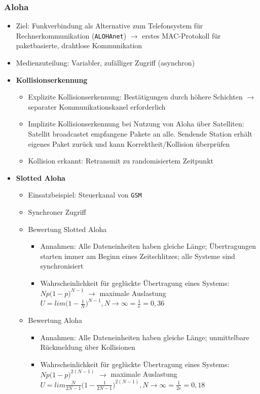 \subsubsection{Aloha}
\begin{itemize}
	\item Ziel: Funkverbindung als Alternative zum Telefonsystem für Rechnerkommunikation (\texttt{ALOHAnet}) \(\rightarrow\) erstes MAC-Protokoll für paketbasierte, drahtlose Kommunikation
	\item Medienzuteilung: Variabler, zufälliger Zugriff (asynchron)
	\item \textbf{Kollisionserkennung}
	\begin{itemize}
		\item Explizite Kollisionserkennung: Bestätigungen durch höhere Schichten \(\rightarrow\) separater Kommunikationskanel erforderlich
		\item Implizite Kollisionserkennung bei Nutzung von Aloha über Satelliten: Satellit broadcastet empfangene Pakete an alle. Sendende Station erhält eigenes Paket zurück und kann Korrektheit/Kollision überprüfen
		\item Kollision erkannt: Retransmit zu randomisiertem Zeitpunkt
	\end{itemize}
	\item \textbf{Slotted Aloha}
	\begin{itemize}
		\item Einsatzbeispiel: Steuerkanal von \texttt{GSM}
		\item Synchroner Zugriff
		\item Bewertung Slotted Aloha
		\begin{itemize}
			\item Annahmen: Alle Dateneinheiten haben gleiche Länge; Übertragungen starten immer am Beginn eines Zeitschlitzes; alle Systeme sind synchronisiert
			\item Wahrscheinlichkeit für geglückte Übertragung eines Systems: \(Np\big(1-p\big)^{N-1}\) \(\rightarrow\) maximale Auslastung \(U=lim \big(1-\frac{1}{N}\big)^{N-1}, N \rightarrow \infty = \frac{1}{e} = 0,36\)
		\end{itemize}
		\item Bewertung Aloha
		\begin{itemize}
			\item Annahmen: Alle Dateneinheiten haben gleiche Länge; unmittelbare Rückmeldung über Kollisionen
			\item Wahrscheinlichkeit für geglückte Übertragung eines Systems: \(Np\big(1-p\big)^{2(N-1)}\) \(\rightarrow\) maximale Auslastung \(U=lim \frac{N}{2N-1} \big(1-\frac{1}{2N-1}\big)^{2(N-1)}, N \rightarrow \infty = \frac{1}{2e} = 0,18\)
		\end{itemize}
	\end{itemize}
\end{itemize}

